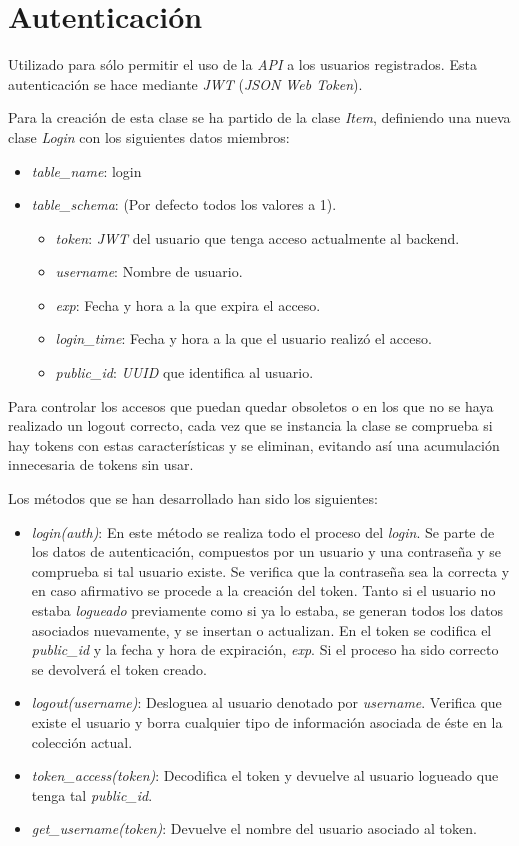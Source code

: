\section{Autenticación}

Utilizado para sólo permitir el uso de la \textit{API} a los usuarios registrados. Esta autenticación se hace mediante \textit{JWT} (\textit{JSON Web Token}).

Para la creación de esta clase se ha partido de la clase \textit{Item}, definiendo una nueva clase \textit{Login} con los siguientes datos miembros:
\begin{itemize}
	\item \textit{table\_name}: login
	\item \textit{table\_schema}: (Por defecto todos los valores a 1).
	\begin{itemize}
		\item \textit{token}: \textit{JWT} del usuario que tenga acceso actualmente al backend.
		\item \textit{username}: Nombre de usuario.
		\item \textit{exp}: Fecha y hora a la que expira el acceso.
		\item \textit{login\_time}: Fecha y hora a la que el usuario realizó el acceso.
		\item \textit{public\_id}: \textit{UUID} que identifica al usuario.
	\end{itemize}
\end{itemize}



\bigskip
Para controlar los accesos que puedan quedar obsoletos o en los que no se haya realizado un logout correcto, cada vez que se instancia la clase se comprueba si hay tokens con estas características y se eliminan, evitando así una acumulación innecesaria de tokens sin usar.

\bigskip
Los métodos que se han desarrollado han sido los siguientes:
\begin{itemize}
	\item \textit{login(auth)}: En este método se realiza todo el proceso del \textit{login}. Se parte de los datos de autenticación, compuestos por un usuario y una contraseña y se comprueba si tal usuario existe. Se verifica que la contraseña sea la correcta y en caso afirmativo se procede a la creación del token. Tanto si el usuario no estaba \textit{logueado} previamente como si ya lo estaba, se generan todos los datos asociados nuevamente, y se insertan o actualizan. En el token se codifica el \textit{public\_id} y la fecha y hora de expiración, \textit{exp}. Si el proceso ha sido correcto se devolverá el token creado.
	\item \textit{logout(username)}: Desloguea al usuario denotado por \textit{username}. Verifica que existe el usuario y borra cualquier tipo de información asociada de éste en la colección actual.
	\item \textit{token\_access(token)}: Decodifica el token y devuelve al usuario logueado que tenga tal \textit{public\_id}.
	\item \textit{get\_username(token)}: Devuelve el nombre del usuario asociado al token.
\end{itemize}


